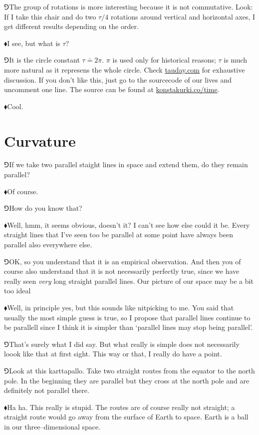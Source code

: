 \documentclass[10pt,oneside%
]{memoir}
\newcommand{\circc}{\tau}
\newcommand{\hea}{\(\blacklozenge\)\;}
\newcommand{\heb}{\(\Game\)\;}
\begin{document}
\heb The group of rotations is more interesting because it is not commutative. Look: If I take this chair and do two \(\circc/4\) rotations around vertical and horizontal axes, I get different results depending on the order.

\hea I see, but what is \(\circc\)?

\heb It is the circle constant \(\circc\doteq2\pi\). \(\pi\) is used only for historical reasons; \(\circc\) is much more natural as it represens the whole circle. Check \url{tauday.com} for exhaustive discussion. If you don't like this, just go to the sourcecode of our lives and uncomment one line. The source can be found at \url{konstakurki.co/time}.

\hea Cool.
\chapter{Curvature}
\heb If we take two parallel staight lines in space and extend them, do they remain parallel?

\hea Of course.

\heb How do you know that?

\hea Well, hmm, it seems obvious, doesn't it? I can't see how else could it be. Every straight lines that I've seen too be parallel at some point have always been parallel also everywhere else.

\heb OK, so you understand that it is an empirical observation. And then you of course also understand that it is not necessarily perfectly true, since we have really seen \emph{very} long straight parallel lines. Our picture of our space may be a bit too ideal

\hea Well, in principle yes, but this sounds like nitpicking to me. You said that usually the most simple guess is true, so I propose that parallel lines continue to be parallell since I think it is simpler than `parallel lines may stop being parallel'.

\heb That's surely what I did say. But what really is simple does not necessarily loook like that at first sight. This way or that, I really do have a point.

\heb Look at this karttapallo. Take two straight routes from the equator to the north pole. In the beginning they are parallel but they cross at the north pole and are definitely not parallel there.

\hea Ha ha. This really is stupid. The routes are of course really not straight; a straight route would go away from the surface of Earth to space. Earth is a ball in our three--dimensional space.
\end{document}
